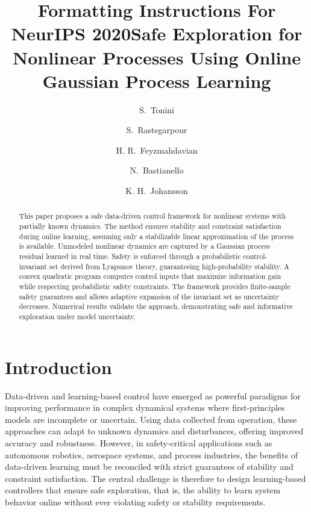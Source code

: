 \documentclass[10pt]{article}
\title{Formatting Instructions For NeurIPS 2020}
\newcommand{\1}{\mathbbm{1}}
\begin{document}
\title{\bf Safe Exploration for Nonlinear Processes Using Online Gaussian Process Learning}
%
\author[1]{S.\ Tonini}
\author[1]{S.\ Rastegarpour}
\author[1]{H. R.\ Feyzmahdavian}
\author[2]{N.\ Bastianello}
\author[2]{K. H.\ Johansson}
%
%
\maketitle

%
%
\begin{abstract}                
This paper proposes a safe data-driven control framework for nonlinear systems with partially known dynamics. The method ensures stability and constraint satisfaction during online learning, assuming only a stabilizable linear approximation of the process is available. Unmodeled nonlinear dynamics are captured by a Gaussian process residual learned in real time. Safety is enforced through a probabilistic control-invariant set derived from Lyapunov theory, guaranteeing high-probability stability. A convex quadratic program computes control inputs that maximize information gain while respecting probabilistic safety constraints. The framework provides finite-sample safety guarantees and allows adaptive expansion of the invariant set as uncertainty decreases. Numerical results validate the approach, demonstrating safe and informative exploration under model uncertainty.
\end{abstract}

%
%
\section{Introduction}
Data-driven and learning-based control have emerged as powerful paradigms for improving performance in complex dynamical systems where first-principles models are incomplete or uncertain. Using data collected from operation, these approaches can adapt to unknown dynamics and disturbances, offering improved accuracy and robustness. However, in safety-critical applications such as autonomous robotics, aerospace systems, and process industries, the benefits of data-driven learning must be reconciled with strict guarantees of stability and constraint satisfaction. The central challenge is therefore to design learning-based controllers that ensure safe exploration, that is, the ability to learn system behavior online without ever violating safety or stability requirements.
\end{document}
